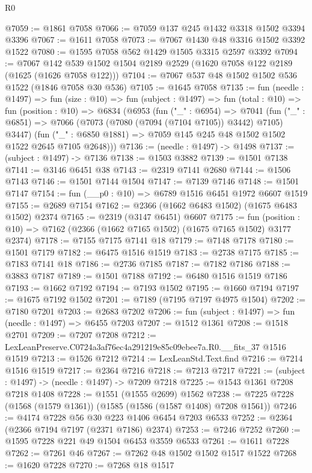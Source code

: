 \begin{lexlean}{R0}
\begin{coremodule}
@7059 := @1861 @7058
@7066 := @7059 @137 @245 @1432 @3318 @1502 @3394 @3396
@7067 := @1611 @7058
@7073 := @7067 @1430 @48 @3316 @1502 @3392 @1522
@7080 := @1595 @7058 @562 @1429 @1505 @3315 @2597 @3392
@7094 := @7067 @142 @539 @1502 @1504 @2189 @2529 (@1620 @7058 @122 @2189 (@1625 (@1626 @7058 @122)))
@7104 := @7067 @537 @48 @1502 @1502 @536 @1522 (@1846 @7058 @30 @536)
@7105 := @1645 @7058
@7135 := fun (needle : @1497) =>
  fun (size : @10) =>
  fun (subject : @1497) =>
  fun (total : @10) =>
  fun (position : @10) =>
  @6834
    (@6953
      (fun ("_" : @6954) =>
      @7041
        (fun ("_" : @6851) => @7066 (@7073 (@7080 (@7094 (@7104 @7105)) @3442) @7105) @3447)
        (fun ("_" : @6850 @1881) => @7059 @145 @245 @48 @1502 @1502 @1522 @2645 @7105 @2648)))
@7136 := (needle : @1497) -> @1498
@7137 := (subject : @1497) -> @7136
@7138 := @1503 @3882
@7139 := @1501 @7138
@7141 := @3146 @6451 @38
@7143 := @2319 @7141 @2680
@7144 := @1506 @7143
@7146 := @1501 @7144 @1504
@7147 := @7139 @7146
@7148 := @1501 @7147
@7154 := fun (__p0 : @10) => @6789 @1516 @6451 @1972 @6607 @1519
@7155 := @2689 @7154
@7162 := @2366 (@1662 @6483 @1502) (@1675 @6483 @1502) @2374
@7165 := @2319 (@3147 @6451) @6607
@7175 := fun (position : @10) => @7162 (@2366 (@1662 @7165 @1502) (@1675 @7165 @1502) @3177 @2374)
@7178 := @7155 @7175 @7141 @18
@7179 := @7148 @7178
@7180 := @1501 @7179
@7182 := @6475 @1516 @1519
@7183 := @2738 @7175
@7185 := @7183 @7141 @18
@7186 := @2736 @7185
@7187 := @7182 @7186
@7188 := @3883 @7187
@7189 := @1501 @7188
@7192 := @6480 @1516 @1519 @7186
@7193 := @1662 @7192
@7194 := @7193 @1502
@7195 := @1660 @7194
@7197 := @1675 @7192 @1502
@7201 := @7189 (@7195 @7197 @4975 @1504)
@7202 := @7180 @7201
@7203 := @2683 @7202
@7206 := fun (subject : @1497) => fun (needle : @1497) => @6455 @7203
@7207 := @1512 @1361
@7208 := @1518 @2701
@7209 := @7207 @7208
@7212 := LexLeanPreserve.C0724a3af76ec4a291219e85c09ebee7a.R0.__fits_37 @1516 @1519
@7213 := @1526 @7212
@7214 := LexLeanStd.Text.find
@7216 := @7214 @1516 @1519
@7217 := @2364 @7216
@7218 := @7213 @7217
@7221 := (subject : @1497) -> (needle : @1497) -> @7209 @7218
@7225 := @1543 @1361 @7208 @7218 @1408
@7228 := @1551 (@1555 @2699) @1562
@7238 := @7225 @7228 (@1568 (@1579 @1361)) (@1585 (@1586 (@1587 @1408) @7208 @1561))
@7246 := @4174 @7228 @56 @30 @223 @1406 @6454 @7203 @6533
@7252 := @2364 (@2366 @7194 @7197 (@2371 @7186) @2374)
@7253 := @7246 @7252
@7260 := @1595 @7228 @221 @49 @1504 @6453 @3559 @6533
@7261 := @1611 @7228
@7262 := @7261 @46
@7267 := @7262 @48 @1502 @1502 @1517 @1522
@7268 := @1620 @7228
@7270 := @7268 @18 @1517

\end{coremodule}
\end{lexlean}
